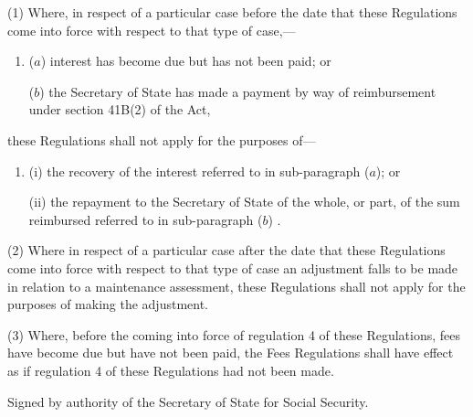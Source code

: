 \documentclass[12pt,a4paper]{article}
\begin{document}
(1)  Where, in respect of a particular case before the date that these Regulations come into force with respect to that type of case,—
\begin{enumerate}\item[]
($a$) interest has become due but has not been paid;
or  %

($b$) the Secretary of State has made a payment by way of reimbursement under section 41B(2) of the Act, 

\end{enumerate}
these Regulations shall not apply for the purposes of—
\begin{enumerate}\item[]
(i) the recovery of the interest referred to in sub-paragraph ($a$);
or  %

(ii) the repayment to the Secretary of State of the whole, or part, of the sum reimbursed referred to in sub-paragraph ($b$)%
%
.
\end{enumerate}

(2) Where in respect of a particular case after the date that these Regulations come into force with respect to that type of case an adjustment falls to be made in relation to a maintenance assessment, these Regulations shall not apply for the purposes of making the adjustment.

(3) Where, before the coming into force of regulation 4 of these Regulations, fees have become due but have not been paid, the Fees Regulations shall have effect as if regulation 4 of these Regulations had not been made. 


\bigskip

Signed 
by authority of the Secretary of State for Social Security.
\end{document}
